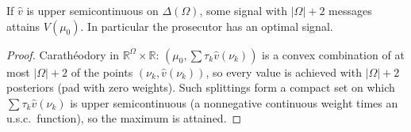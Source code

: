 \begin{theorem}
\label{thm:info-exist}
\leanok
{}
If $\hat v$ is upper semicontinuous on $\Delta(\Omega)$, some signal with $|\Omega|+2$ messages attains $V(\mu_0)$. In
particular the prosecutor has an optimal signal.
\end{theorem}
\begin{proof}
\leanok
Carathéodory in $\mathbb{R}^\Omega\times\mathbb{R}$: $(\mu_0,\sum\tau_k\hat v(\nu_k))$ is a convex combination of at most
$|\Omega|+2$ of the points $(\nu_k,\hat v(\nu_k))$, so every value is achieved with $|\Omega|+2$ posteriors (pad with zero
weights). Such splittings form a compact set on which $\sum\tau_k\hat v(\nu_k)$ is upper semicontinuous
(a nonnegative continuous weight times an u.s.c.\ function), so the maximum is attained.
\end{proof}
